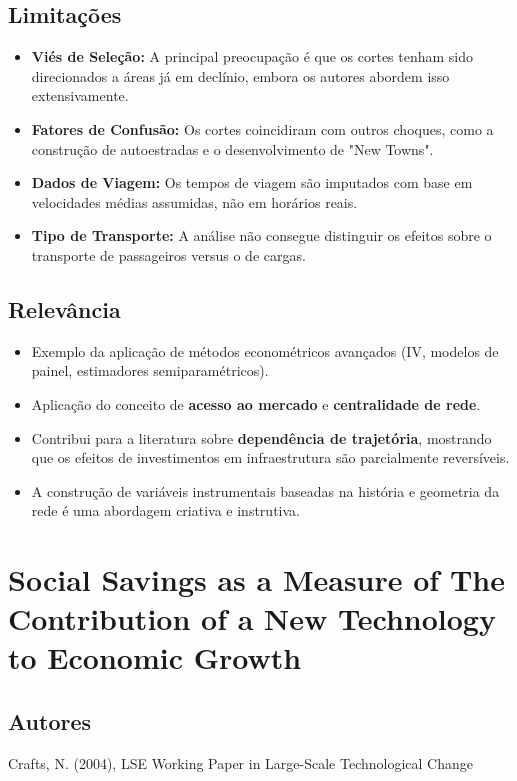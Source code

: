 \documentclass[12pt]{article}
\begin{document}
\subsection*{Limitações}
\begin{itemize}
    \item \textbf{Viés de Seleção:} A principal preocupação é que os cortes tenham sido direcionados a áreas já em declínio, embora os autores abordem isso extensivamente.
    \item \textbf{Fatores de Confusão:} Os cortes coincidiram com outros choques, como a construção de autoestradas e o desenvolvimento de "New Towns".
    \item \textbf{Dados de Viagem:} Os tempos de viagem são imputados com base em velocidades médias assumidas, não em horários reais.
    \item \textbf{Tipo de Transporte:} A análise não consegue distinguir os efeitos sobre o transporte de passageiros versus o de cargas.
\end{itemize}

\subsection*{Relevância}
\begin{itemize}
    \item Exemplo da aplicação de métodos econométricos avançados (IV, modelos de painel, estimadores semiparamétricos).
    \item Aplicação do conceito de \textbf{acesso ao mercado} e \textbf{centralidade de rede}.
    \item Contribui para a literatura sobre \textbf{dependência de trajetória}, mostrando que os efeitos de investimentos em infraestrutura são parcialmente reversíveis.
    \item A construção de variáveis instrumentais baseadas na história e geometria da rede é uma abordagem criativa e instrutiva.
\end{itemize}
\newpage

\section{Social Savings as a Measure of The Contribution of a New Technology to Economic Growth}

\subsection*{Autores}
Crafts, N. (2004), LSE Working Paper in Large-Scale Technological Change
\end{document}
